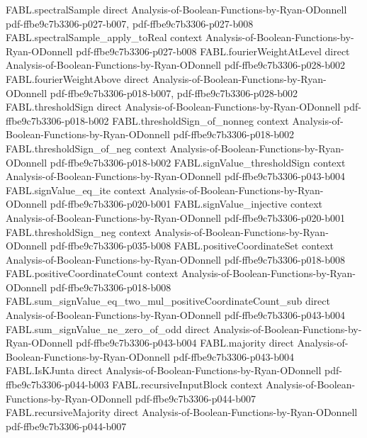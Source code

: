 \begin{theorem}
\proofstep
  {FABL.spectralSample}
  {direct}
  {Analysis-of-Boolean-Functions-by-Ryan-ODonnell}
  {pdf-ffbe9c7b3306-p027-b007,
    pdf-ffbe9c7b3306-p027-b008}
\proofstep
  {FABL.spectralSample_apply_toReal}
  {context}
  {Analysis-of-Boolean-Functions-by-Ryan-ODonnell}
  {pdf-ffbe9c7b3306-p027-b008}
\proofstep
  {FABL.fourierWeightAtLevel}
  {direct}
  {Analysis-of-Boolean-Functions-by-Ryan-ODonnell}
  {pdf-ffbe9c7b3306-p028-b002}
\proofstep
  {FABL.fourierWeightAbove}
  {direct}
  {Analysis-of-Boolean-Functions-by-Ryan-ODonnell}
  {pdf-ffbe9c7b3306-p018-b007,
    pdf-ffbe9c7b3306-p028-b002}
\proofstep
  {FABL.thresholdSign}
  {direct}
  {Analysis-of-Boolean-Functions-by-Ryan-ODonnell}
  {pdf-ffbe9c7b3306-p018-b002}
\proofstep
  {FABL.thresholdSign_of_nonneg}
  {context}
  {Analysis-of-Boolean-Functions-by-Ryan-ODonnell}
  {pdf-ffbe9c7b3306-p018-b002}
\proofstep
  {FABL.thresholdSign_of_neg}
  {context}
  {Analysis-of-Boolean-Functions-by-Ryan-ODonnell}
  {pdf-ffbe9c7b3306-p018-b002}
\proofstep
  {FABL.signValue_thresholdSign}
  {context}
  {Analysis-of-Boolean-Functions-by-Ryan-ODonnell}
  {pdf-ffbe9c7b3306-p043-b004}
\proofstep
  {FABL.signValue_eq_ite}
  {context}
  {Analysis-of-Boolean-Functions-by-Ryan-ODonnell}
  {pdf-ffbe9c7b3306-p020-b001}
\proofstep
  {FABL.signValue_injective}
  {context}
  {Analysis-of-Boolean-Functions-by-Ryan-ODonnell}
  {pdf-ffbe9c7b3306-p020-b001}
\proofstep
  {FABL.thresholdSign_neg}
  {context}
  {Analysis-of-Boolean-Functions-by-Ryan-ODonnell}
  {pdf-ffbe9c7b3306-p035-b008}
\proofstep
  {FABL.positiveCoordinateSet}
  {context}
  {Analysis-of-Boolean-Functions-by-Ryan-ODonnell}
  {pdf-ffbe9c7b3306-p018-b008}
\proofstep
  {FABL.positiveCoordinateCount}
  {context}
  {Analysis-of-Boolean-Functions-by-Ryan-ODonnell}
  {pdf-ffbe9c7b3306-p018-b008}
\proofstep
  {FABL.sum_signValue_eq_two_mul_positiveCoordinateCount_sub}
  {direct}
  {Analysis-of-Boolean-Functions-by-Ryan-ODonnell}
  {pdf-ffbe9c7b3306-p043-b004}
\proofstep
  {FABL.sum_signValue_ne_zero_of_odd}
  {direct}
  {Analysis-of-Boolean-Functions-by-Ryan-ODonnell}
  {pdf-ffbe9c7b3306-p043-b004}
\proofstep
  {FABL.majority}
  {direct}
  {Analysis-of-Boolean-Functions-by-Ryan-ODonnell}
  {pdf-ffbe9c7b3306-p043-b004}
\proofstep
  {FABL.IsKJunta}
  {direct}
  {Analysis-of-Boolean-Functions-by-Ryan-ODonnell}
  {pdf-ffbe9c7b3306-p044-b003}
\proofstep
  {FABL.recursiveInputBlock}
  {context}
  {Analysis-of-Boolean-Functions-by-Ryan-ODonnell}
  {pdf-ffbe9c7b3306-p044-b007}
\proofstep
  {FABL.recursiveMajority}
  {direct}
  {Analysis-of-Boolean-Functions-by-Ryan-ODonnell}
  {pdf-ffbe9c7b3306-p044-b007}

\end{theorem}
